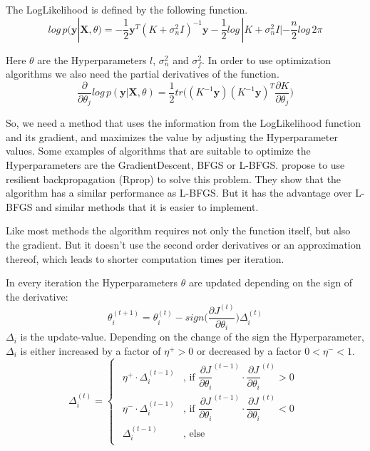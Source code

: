The \gls{LogLikelihood} is defined by the following function\citep[p. 113]{Rasmussen:2005:GPM:1162254}.
\begin{equation} \label{eq:ll}
log\,p(\mathbf{y}|\mathbf{X},\theta) = -\dfrac{1}{2}\mathbf{y}^T(K+\sigma^2_nI)^{-1}\mathbf{y}-\dfrac{1}{2}log\,|K+\sigma^2_nI|-\dfrac{n}{2}log\,2\pi
\end{equation}

Here $\theta$ are the \gls{Hyperparameter}s $l$, $\sigma_n^2$ and $\sigma_f^2$. In order to use optimization algorithms we also need the partial derivatives of the function\citep[p. 114]{Rasmussen:2005:GPM:1162254}.
\begin{equation}\label{eq:lld}
\dfrac{\partial}{\partial\theta_j}log\,p(\mathbf{y}|\mathbf{X},\theta) = \dfrac{1}{2}tr\bigg((K^{-1}\mathbf{y}) (K^{-1}\mathbf{y})^T \dfrac{\partial K}{\partial \theta_j}\bigg)
\end{equation}

So, we need a method that uses the information from the \gls{LogLikelihood} function and its gradient, and maximizes the value by adjusting the \gls{Hyperparameter} values. 
Some examples of algorithms that are suitable to optimize the \gls{Hyperparameter}s are the \gls{GradientDescent}\citep{Shewchuk:1994:ICG:865018}, \Gls{BFGS} or \Gls{L-BFGS}\citep{liu1989limited}. \citet{blum2013optimization} propose to use resilient backpropagation (\Gls{Rprop}) to solve this problem. They show that the algorithm has a similar performance as \Gls{L-BFGS}. But it has the advantage over \Gls{L-BFGS} and similar methods that it is easier to implement.

Like most methods the algorithm requires not only the function itself, but also the gradient. But it doesn't use the second order derivatives or an approximation thereof, which leads to shorter computation times per iteration\citep{blum2013optimization}. 

In every iteration the \gls{Hyperparameter}s $\theta$ are updated depending on the sign of the derivative:
\begin{equation}
\theta_i^{(t+1)} = \theta_i^{(t)} - sign\bigg(\dfrac{\partial J^{(t)}}{\partial \theta_i}\bigg) \Delta_i^{(t)}
\end{equation}
$\Delta_i$ is the update-value. Depending on the change of the sign the \gls{Hyperparameter}, $\Delta_i$ is either increased by a factor of $\eta^+ > 0$ or decreased by a factor $0 < \eta^- < 1$. 
\begin{equation}
\Delta_i^{(t)} = 
\begin{cases}
\begin{aligned}
\eta^+\cdot\Delta_i^{(t-1)} &\text{, if } \dfrac{\partial J}{\partial \theta_i}^{(t-1)}\cdot\dfrac{\partial J}{\partial \theta_i}^{(t)} > 0 \\
\eta^-\cdot\Delta_i^{(t-1)} &\text{, if } \dfrac{\partial J}{\partial \theta_i}^{(t-1)}\cdot\dfrac{\partial J}{\partial \theta_i}^{(t)} < 0\\
\Delta_i^{(t-1)} &\text{, else}
\end{aligned}
\end{cases}
\end{equation}

